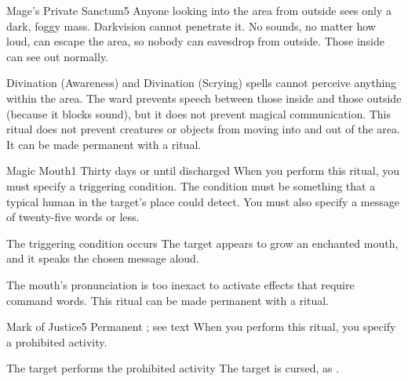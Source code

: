 \begin{spellsection}{Mage's Private Sanctum}{5}
\spelldur \durext \dismissable
{}
\spellline
\spelleffect Anyone looking into the area from outside sees only a dark, foggy mass. Darkvision cannot penetrate it. No sounds, no matter how loud, can escape the area, so nobody can eavesdrop from outside. Those inside can see out normally.

Divination (Awareness) and Divination (Scrying) spells cannot perceive anything within the area. The ward prevents speech between those inside and those outside (because it blocks sound), but it does not prevent magical communication.
\spellnotes This ritual does not prevent creatures or objects from moving into and out of the area. It can be made permanent with a  ritual.
\end{spellsection}

\begin{spellsection}{Magic Mouth}{1}
\spellrng{\rngclose}
\spelldur Thirty days or until discharged \dismissable
\spellspecial When you perform this ritual, you must specify a triggering condition. The condition must be something that a typical human in the target's place could detect. You must also specify a message of twenty-five words or less.
\begin{spelltrigger}{The triggering condition occurs}
    \spelleffect The target appears to grow an enchanted mouth, and it speaks the chosen message aloud.
\end{spelltrigger}
\spellnotes The mouth's pronunciation is too inexact to activate effects that require command words. This ritual can be made permanent with a  ritual.
\end{spellsection}

\begin{spellsection}{Mark of Justice}{5}
\spelldur Permanent \dismissable; see text
\spellspecial When you perform this ritual, you specify a prohibited activity.
\begin{spelltrigger}{The target performs the prohibited activity}
    \spelleffect The target is cursed, as .
\end{spelltrigger}
\spellnotes \cursespellnotes
{}
\end{spellsection}

